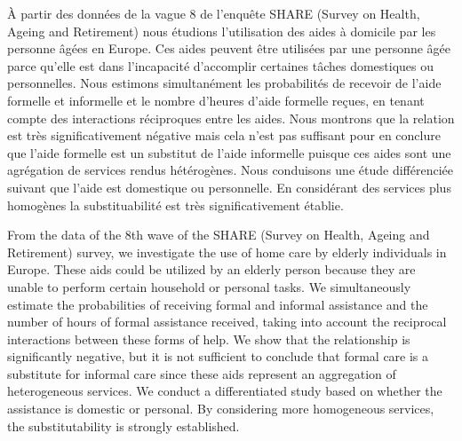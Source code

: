 \begin{Article}[Titre=Aides formelles et informelles pour les seniors : substituabilité ou complémentarité ?, Auteur={Liliane Bonnal\thanks{Université de Poitiers, LÉP; Université de Toulouse 1 Capitole, TSE-R}, Pascal Favard\thanks{Université de Tours, IRJI François-Rabelais. \textit{Correspondance :} pascal.favard@univ-tours.fr}, Thomas Maurice\thanks{Université de Poitiers, LÉP}}]

\label{Bonnaletal}


\begin{refsection}[Bonnal]
    
\begin{resume}
\`A partir des données de la vague 8 de l'enquête SHARE (Survey on Health, Ageing and Retirement) nous étudions l’utilisation des aides à domicile par les personne âgées en Europe. Ces aides peuvent être utilisées par une personne âgée parce qu’elle est dans l’incapacité d'accomplir certaines tâches domestiques ou personnelles. Nous estimons simultanément les probabilités de recevoir de l’aide formelle et informelle et le nombre d’heures d’aide formelle reçues, en tenant compte des interactions réciproques entre les aides. Nous montrons que la relation est très significativement négative mais cela n'est pas suffisant pour en conclure que l'aide formelle est un substitut de l'aide informelle puisque ces aides sont une agrégation de services rendus hétérogènes. Nous conduisons une étude différenciée suivant que l’aide est domestique ou personnelle. En considérant des services plus homogènes la substituabilité est très significativement établie.
\end{resume}


    
\begin{resumeENG}
From the data of the 8th wave of the SHARE (Survey on Health, Ageing and Retirement) survey, we investigate the use of home care by elderly individuals in Europe. These aids could be utilized by an elderly person because they are unable to perform certain household or personal tasks. We simultaneously estimate the probabilities of receiving formal and informal assistance and the number of hours of formal assistance received, taking into account the reciprocal interactions between these forms of help. We show that the relationship is significantly negative, but it is not sufficient to conclude that formal care is a substitute for informal care since these aids represent an aggregation of heterogeneous services. We conduct a differentiated study based on whether the assistance is domestic or personal. By considering more homogeneous services, the substitutability is strongly established.
\end{resumeENG}


\end{refsection}
\end{Article}
